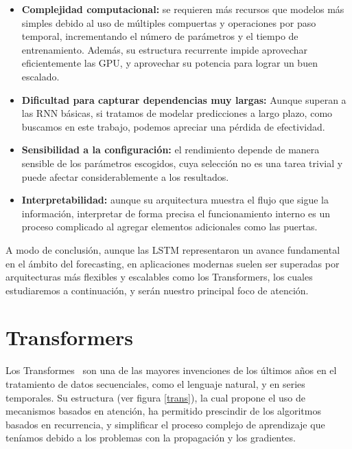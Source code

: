 \begin{itemize}
    \item \textbf{Complejidad computacional:} se requieren más recursos que modelos más simples debido al uso de múltiples compuertas y operaciones por paso temporal, incrementando el número de parámetros y el tiempo de entrenamiento. Además, su estructura recurrente impide aprovechar eficientemente las GPU, y aprovechar su potencia para lograr un buen escalado.

    \item \textbf{Dificultad para capturar dependencias muy largas:} Aunque superan a las RNN básicas, si tratamos de modelar predicciones a largo plazo, como buscamos en este trabajo, podemos apreciar una pérdida de efectividad.

    \item \textbf{Sensibilidad a la configuración:} el rendimiento depende de manera sensible de los parámetros escogidos, cuya selección no es una tarea trivial y puede afectar considerablemente a los resultados.

    \item \textbf{Interpretabilidad:} aunque su arquitectura muestra el flujo que sigue la información, interpretar de forma precisa el funcionamiento interno es un proceso complicado al agregar elementos adicionales como las puertas.

\end{itemize}

A modo de conclusión, aunque las LSTM representaron un avance fundamental en el ámbito del forecasting, en aplicaciones modernas suelen ser superadas por arquitecturas más flexibles y escalables como los Transformers, los cuales estudiaremos a continuación, y serán nuestro principal foco de atención.


\section{Transformers}

Los Transformes~\cite{vaswani2023attentionneed} son una de las mayores invenciones de los últimos años en el tratamiento de datos secuenciales, como el lenguaje natural, y en series temporales. Su estructura (ver figura \ref{trans}), la cual propone el uso de mecanismos basados en atención, ha permitido prescindir de los algoritmos basados en recurrencia, y simplificar el proceso complejo de aprendizaje que teníamos debido a los problemas con la propagación y los gradientes.\\

